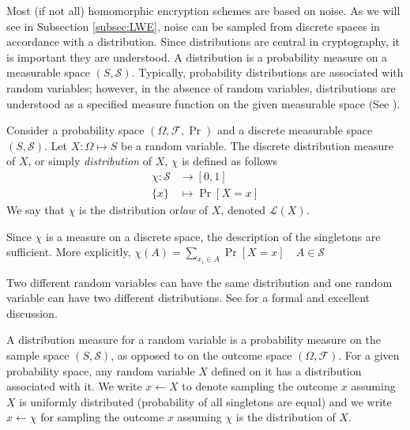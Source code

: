 Most (if not all) homomorphic encryption schemes are based on noise. As we will see in Subsection \ref{subsec:LWE}, noise can be sampled from discrete spaces in accordance with a distribution. Since distributions are central in cryptography, it is important they are understood. A distribution is a probability measure on a measurable space $(S, \mathcal{S})$. Typically, probability distributions are associated with random variables; however, in the absence of random variables, distributions are understood as a specified measure function on the given measurable space (See \cite[pp. 83]{kallenberg-probability}).
\begin{definition}
Consider a probability space $(\Omega, \mathcal{F}, \operatorname{Pr})$ and a discrete measurable space $(S,\mathcal{S})$. Let $X \colon \Omega \mapsto S$ be a random variable. The discrete distribution measure of $X$, or simply \textit{distribution} of $X$, $\chi$ is defined as follows
\begin{equation*}
\begin{aligned}
    \chi \colon \mathcal{S} &\to [0,1]\\
    \{x\} &\mapsto \operatorname{Pr}[X = x]
\end{aligned}
\end{equation*}
We say that $\chi$ is the distribution or\textit{law} of $X$, denoted $\mathcal{L}(X)$. 
\end{definition}
\begin{remark}
    Since $\chi$ is a measure on a discrete space, the description of the singletons are sufficient. More explicitly, $\chi(A) = \sum_{x_i \in A} \operatorname{Pr}[X = x] \quad A \in \mathcal{S}$
\end{remark}
\begin{remark}
     Two different random variables can have the same distribution and one random variable can have two different distributions. See \cite{cont-finance} for a formal and excellent discussion.
\end{remark}

A distribution measure for a random variable is a probability measure on the sample space $(S,\mathcal{S})$, as opposed to on the outcome space $(\Omega, \mathcal{F})$. For a given probability space, any random variable $X$ defined on it has a distribution associated with it. We write $x \leftarrow X$ to denote sampling the outcome $x$ assuming $X$ is uniformly distributed (probability of all singletons are equal) and we write $x \leftarrow \chi$ for sampling the outcome $x$ assuming $\chi$ is the distribution of $X$.

